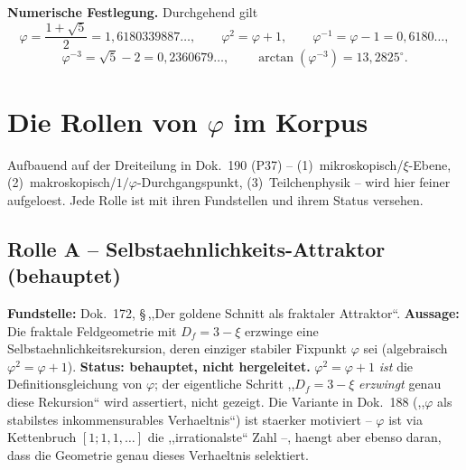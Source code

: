 \noindent\textbf{Numerische Festlegung.} Durchgehend gilt
\begin{equation}
  \varphi = \frac{1+\sqrt5}{2} = 1{,}6180339887\ldots, \qquad
  \varphi^2 = \varphi + 1, \qquad
  \varphi^{-1} = \varphi - 1 = 0{,}6180\ldots,
\end{equation}
\begin{equation}
  \varphi^{-3} = \sqrt5 - 2 = 0{,}2360679\ldots, \qquad
  \arctan(\varphi^{-3}) = 13{,}2825^\circ .
\end{equation}

\section{Die Rollen von $\varphi$ im Korpus}

Aufbauend auf der Dreiteilung in Dok.~190 (P37) -- (1)~mikroskopisch/$\xi$-Ebene,
(2)~makroskopisch/$1/\varphi$-Durchgangspunkt, (3)~Teilchenphysik -- wird hier
feiner aufgeloest. Jede Rolle ist mit ihren Fundstellen und ihrem Status
versehen.

\subsection{Rolle A -- Selbstaehnlichkeits-Attraktor (behauptet)}
\textbf{Fundstelle:} Dok.~172, \S\,,,Der goldene Schnitt als fraktaler
Attraktor``. \textbf{Aussage:} Die fraktale Feldgeometrie mit $D_f=3-\xi$
erzwinge eine Selbstaehnlichkeitsrekursion, deren einziger stabiler Fixpunkt
$\varphi$ sei (algebraisch $\varphi^2=\varphi+1$).
\textbf{Status: behauptet, nicht hergeleitet.} $\varphi^2=\varphi+1$
\emph{ist} die Definitionsgleichung von $\varphi$; der eigentliche Schritt
,,$D_f=3-\xi$ \emph{erzwingt} genau diese Rekursion`` wird assertiert, nicht
gezeigt. Die Variante in Dok.~188 (,,$\varphi$ als stabilstes inkommensurables
Verhaeltnis``) ist staerker motiviert -- $\varphi$ ist via Kettenbruch
$[1;1,1,\dots]$ die ,,irrationalste`` Zahl --, haengt aber ebenso daran, dass
die Geometrie genau dieses Verhaeltnis selektiert.


